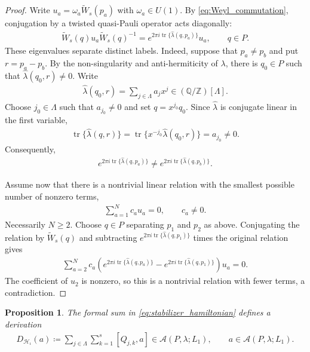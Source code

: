 \documentclass[sn-mathphys-num]{sn-jnl}
\newtheorem{proposition}[lemma]{Proposition}
\theoremstyle{definition}
\numberwithin{equation}{section}
\theoremstyle{definition}
\def\CA{{\mathcal A}}
\def\CH {{\mathcal H}}
\def\IQ{\mathbb{Q}}
\def\IZ{{\mathbb{Z}}}
\def\La{{\Lambda}}
\def\l{{\lambda}}
\def\hl{{\hat \lambda}}
\def\tr{\operatorname{tr}}
\begin{document}
\begin{proof}
Write $u_a=\omega_a\widetilde W_s(p_a)$ with $\omega_a\in U(1)$. By
\eqref{eq:Weyl_commutation}, conjugation by a twisted quasi-Pauli operator
acts diagonally:
\begin{align*}
    \widetilde W_s(q)u_a\widetilde W_s(q)^{-1}
    =
    e^{2\pi i\tr\{\hl(q,p_a)\}}u_a,
    \qquad q\in P.
\end{align*}
These eigenvalues separate distinct labels. Indeed, suppose that
$p_a\neq p_b$ and put $r=p_a-p_b$. By the non-singularity and
anti-hermiticity of $\l$, there is $q_0\in P$ such that
$\hl(q_0,r)\neq0$. Write
\begin{align*}
    \hl(q_0,r)=\sum_{j\in\La}a_jx^j
    \in(\IQ/\IZ)[\La].
\end{align*}
Choose $j_0\in\La$ such that $a_{j_0}\neq0$ and set
$q=x^{j_0}q_0$. Since $\hl$ is conjugate linear in the first variable,
\begin{align*}
    \tr\{\hl(q,r)\}
    =
    \tr\{x^{-j_0}\hl(q_0,r)\}
    =
    a_{j_0}\neq0.
\end{align*}
Consequently,
\begin{align*}
    e^{2\pi i\tr\{\hl(q,p_a)\}}
    \neq
    e^{2\pi i\tr\{\hl(q,p_b)\}}.
\end{align*}

Assume now that there is a nontrivial linear relation with the smallest
possible number of nonzero terms,
\begin{align*}
    \sum_{a=1}^{N}c_au_a=0,
    \qquad c_a\neq0.
\end{align*}
Necessarily $N\geqslant2$. Choose $q\in P$ separating $p_1$ and $p_2$
as above. Conjugating the relation by $\widetilde W_s(q)$ and subtracting
$e^{2\pi i\tr\{\hl(q,p_1)\}}$ times the original relation gives
\begin{align*}
    \sum_{a=2}^{N}
    c_a\left(
        e^{2\pi i\tr\{\hl(q,p_a)\}}
        -
        e^{2\pi i\tr\{\hl(q,p_1)\}}
    \right)u_a=0.
\end{align*}
The coefficient of $u_2$ is nonzero, so this is a nontrivial relation
with fewer terms, a contradiction.
\end{proof}


\begin{proposition}\label{prop:derivation}
The formal sum in \eqref{eq:stabilizer_hamiltonian} defines a derivation
\begin{align}\label{eq:derivation}
    D_{\CH_{\iota}}(a)
    \coloneqq
    \sum_{j\in\La}\sum_{k=1}^{s}[Q_{j,k},a]
    \in\CA(P,\l;L_1),
    \qquad
    a\in\CA(P,\l;L_1).
\end{align}
\end{proposition}
\end{document}
